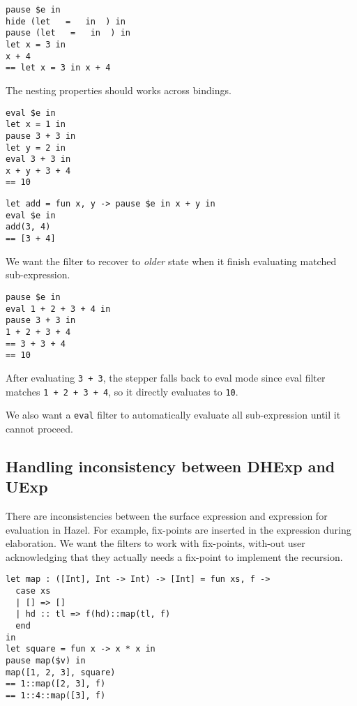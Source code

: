 \begin{verbatim}
pause $e in
hide (let   =   in  ) in
pause (let   =   in  ) in
let x = 3 in
x + 4
== let x = 3 in x + 4
\end{verbatim}

The nesting properties should works across bindings.

\begin{verbatim}
eval $e in
let x = 1 in
pause 3 + 3 in
let y = 2 in
eval 3 + 3 in
x + y + 3 + 4
== 10
\end{verbatim}

\begin{verbatim}
let add = fun x, y -> pause $e in x + y in
eval $e in
add(3, 4)
== [3 + 4]
\end{verbatim}

We want the filter to recover to \emph{older} state when it finish
evaluating matched sub-expression.

\begin{verbatim}
pause $e in
eval 1 + 2 + 3 + 4 in
pause 3 + 3 in
1 + 2 + 3 + 4
== 3 + 3 + 4
== 10
\end{verbatim}

After evaluating \verb|3 + 3|, the stepper falls back to eval mode
since eval filter matches \verb|1 + 2 + 3 + 4|, so it directly
evaluates to \verb|10|.

We also want a \verb|eval| filter to automatically evaluate all sub-expression
until it cannot proceed.

\subsection{Handling inconsistency between DHExp and UExp}


There are inconsistencies between the surface expression and expression for
evaluation in Hazel. For example, fix-points are inserted in the expression
during elaboration. We want the filters to work with fix-points, with-out user
acknowledging that they actually needs a fix-point to implement the recursion.

\begin{verbatim}
let map : ([Int], Int -> Int) -> [Int] = fun xs, f ->
  case xs
  | [] => []
  | hd :: tl => f(hd)::map(tl, f)
  end
in
let square = fun x -> x * x in
pause map($v) in
map([1, 2, 3], square)
== 1::map([2, 3], f)
== 1::4::map([3], f)
\end{verbatim}

